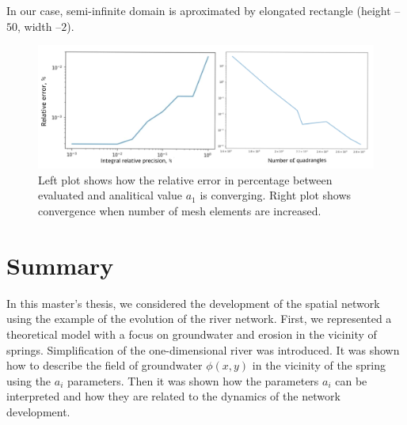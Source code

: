 \documentclass[]{pracamgr}
\begin{document}
    In our case, semi-infinite domain is aproximated by elongated rectangle (height -- $50$, width --$2$).

    \begin{figure}[H]
      \centering
      \includegraphics[width=1\textwidth]{figs/convergence.png}        
      \caption{Left plot shows how the relative error in percentage between evaluated and analitical value $a_1$ is converging. Right plot shows convergence when number of mesh elements are increased.}
      \label{convergence_new}
    \end{figure}

  \chapter{Summary}

    In this master's thesis, we considered the development of the spatial network using the example of the evolution of the river network. First, we represented a theoretical model with a focus on groundwater and erosion in the vicinity of springs. Simplification of the one-dimensional river was introduced. It was shown how to describe the field of groundwater $\phi(x, y)$ in the vicinity of the spring using the $a_i$ parameters. Then it was shown how the parameters $a_i$ can be interpreted and how they are related to the dynamics of the network development.\par
\end{document}
